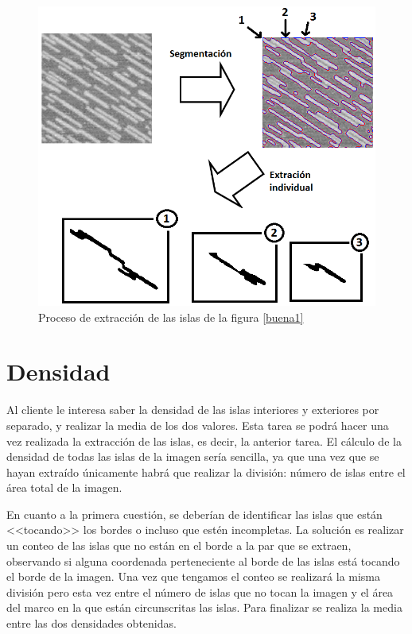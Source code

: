 \begin{figure}[H]
	\captionsetup{justification=centering}
	\centering
	\includegraphics[width=1.1\textwidth]{./imagenes/extraccionIslaBuena}
	\caption{Proceso de extracci\'{o}n de las islas de la figura \ref{buena1} }	
	\label{extraccionIslaBuena}
\end{figure}



\section{Densidad}

Al cliente le interesa saber la densidad de las islas interiores y exteriores por separado, y realizar la media de los dos valores. Esta tarea se podr\'{a} hacer una vez realizada la extracci\'{o}n de las islas, es decir, la anterior tarea. El c\'{a}lculo de la densidad de todas las islas de la imagen ser\'{i}a sencilla, ya que una vez que se hayan extra\'{i}do \'{u}nicamente habr\'{a} que realizar la divisi\'{o}n: n\'{u}mero de islas entre el \'{a}rea total de la imagen.

 En cuanto a la primera cuesti\'{o}n, se deber\'{i}an de identificar las islas que est\'{a}n <<tocando>> los bordes o incluso que est\'{e}n incompletas. La soluci\'{o}n es realizar un conteo de las islas que no est\'{a}n en el borde a la par que se extraen, observando si alguna coordenada perteneciente al borde de las islas est\'{a} tocando el borde de la imagen. Una vez que tengamos el conteo se realizar\'{a} la misma divisi\'{o}n pero esta vez entre el n\'{u}mero de islas que no tocan la imagen y el \'{a}rea del marco en la que est\'{a}n circunscritas las islas. Para finalizar se realiza la media entre las dos densidades obtenidas.

